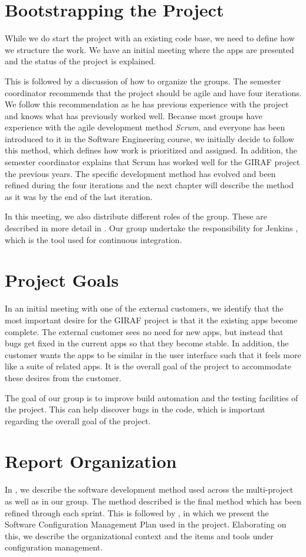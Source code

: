 \section{Bootstrapping the Project}
While we do start the project with an existing code base, we need to define how we structure the work. We have an initial meeting where the apps are presented and the status of the project is explained.

This is followed by a discussion of how to organize the groups. The semester coordinator recommends that the project should be agile and have four iterations. We follow this recommendation as he has previous experience with the project and knows what has previously worked well. Because most groups have experience with the agile development method \emph{Scrum}, and everyone has been introduced to it in the Software Engineering course, we initially decide to follow this method, which defines how work is prioritized and assigned. In addition, the semester coordinator explains that Scrum has worked well for the GIRAF project the previous years. The specific development method has evolved and been refined during the four iterations and the next chapter will describe the method as it was by the end of the last iteration.

In this meeting, we also distribute different roles of the group. These are described in more detail in . Our group undertake the responsibility for Jenkins \cite{JenkinsWebsite}, which is the tool used for continuous integration.

\section{Project Goals}
In an initial meeting with one of the external customers, we identify that the most important desire for the GIRAF project is that it the existing apps become complete. The external customer sees no need for new apps, but instead that bugs get fixed in the current apps so that they become stable. In addition, the customer wants the apps to be similar in the user interface such that it feels more like a suite of related apps. It is the overall goal of the project to accommodate these desires from the customer.

The goal of our group is to improve build automation and the testing facilities of the project. This can help discover bugs in the code, which is important regarding the overall goal of the project.

\section{Report Organization}
In , we describe the software development method used across the multi-project as well as in our group. The method described is the final method which has been refined through each sprint. This is followed by , in which we present the Software Configuration Management Plan used in the project. Elaborating on this, we describe the organizational context and the items and tools under configuration management.

